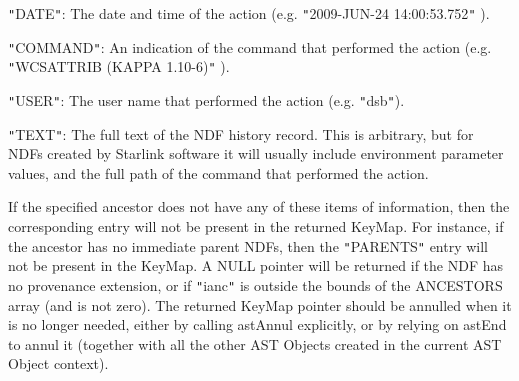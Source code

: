 \documentclass[twoside,11pt,nolof]{starlink}
\begin{document}
{{{{            \sstitem
              \texttt{"}DATE\texttt{"}: The date and time of the action (e.g. \texttt{"}2009-JUN-24
                14:00:53.752\texttt{"} ).

            \sstitem
              \texttt{"}COMMAND\texttt{"}: An indication of the command that performed the
                action (e.g. \texttt{"}WCSATTRIB (KAPPA 1.10-6)\texttt{"} ).

            \sstitem
              \texttt{"}USER\texttt{"}: The user name that performed the action (e.g. \texttt{"}dsb\texttt{"}).

            \sstitem
              \texttt{"}TEXT\texttt{"}: The full text of the NDF history record. This is
                arbitrary, but for NDFs created by Starlink software it will
                usually include environment parameter values, and the full
                path of the command that performed the action.

         }
         If the specified ancestor does not have any of these items of
         information, then the corresponding entry will not be present
         in the returned KeyMap. For instance, if the ancestor has no
         immediate parent NDFs, then the \texttt{"}PARENTS\texttt{"} entry will not be
         present in the KeyMap. A NULL pointer will be returned if the
         NDF has no provenance extension, or if \texttt{"}ianc\texttt{"} is outside the
         bounds of the ANCESTORS array (and is not zero). The returned
         KeyMap pointer should be annulled when it is no longer needed,
         either by calling astAnnul explicitly, or by relying on astEnd
         to annul it (together with all the other AST Objects created in
         the current AST Object context).
      }
   }
}
\end{document}
